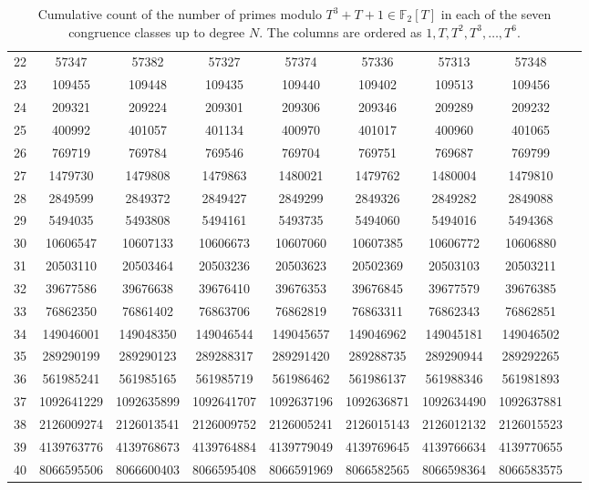 \documentclass[10pt,reqno]{amsproc}
\newcommand{\1}{\mathds{1}}	%
\theoremstyle{definition}
\theoremstyle{remark}
\begin{document}
\begin{table}[h!]
\begin{tabular}{c|cccccccc}
22 & 57347 & 57382 & 57327 & 57374 & 57336 & 57313 & 57348 \\
23 & 109455 & 109448 & 109435 & 109440 & 109402 & 109513 & 109456 \\
24 & 209321 & 209224 & 209301 & 209306 & 209346 & 209289 & 209232 \\
25 & 400992 & 401057 & 401134 & 400970 & 401017 & 400960 & 401065 \\
26 & 769719 & 769784 & 769546 & 769704 & 769751 & 769687 & 769799 \\
27 & 1479730 & 1479808 & 1479863 & 1480021 & 1479762 & 1480004 & 1479810 \\
28 & 2849599 & 2849372 & 2849427 & 2849299 & 2849326 & 2849282 & 2849088 \\
29 & 5494035 & 5493808 & 5494161 & 5493735 & 5494060 & 5494016 & 5494368 \\
30 & 10606547 & 10607133 & 10606673 & 10607060 & 10607385 & 10606772 & 10606880 \\
31 & 20503110 & 20503464 & 20503236 & 20503623 & 20502369 & 20503103 & 20503211 \\
32 & 39677586 & 39676638 & 39676410 & 39676353 & 39676845 & 39677579 & 39676385 \\
33 & 76862350 & 76861402 & 76863706 & 76862819 & 76863311 & 76862343 & 76862851 \\
34 & 149046001 & 149048350 & 149046544 & 149045657 & 149046962 & 149045181 & 149046502 \\
35 & 289290199 & 289290123 & 289288317 & 289291420 & 289288735 & 289290944 & 289292265 \\
36 & 561985241 & 561985165 & 561985719 & 561986462 & 561986137 & 561988346 & 561981893 \\
37 & 1092641229 & 1092635899 & 1092641707 & 1092637196 & 1092636871 & 1092634490 & 1092637881 \\
38 & 2126009274 & 2126013541 & 2126009752 & 2126005241 & 2126015143 & 2126012132 & 2126015523 \\
39 & 4139763776 & 4139768673 & 4139764884 & 4139779049 & 4139769645 & 4139766634 & 4139770655 \\
40 & 8066595506 & 8066600403 & 8066595408 & 8066591969 & 8066582565 & 8066598364 & 8066583575 \\
\bottomrule
\end{tabular}%
\caption{Cumulative count of the number of primes modulo \(T^3 + T + 1 \in \mathbb{F}_2[T]\) in each of the seven congruence classes up to degree $N$. The columns are ordered as \(1, T, T^2, T^3, \dots, T^6\).}
\label{tab:T3T1cum}
\end{table}
\end{document}
